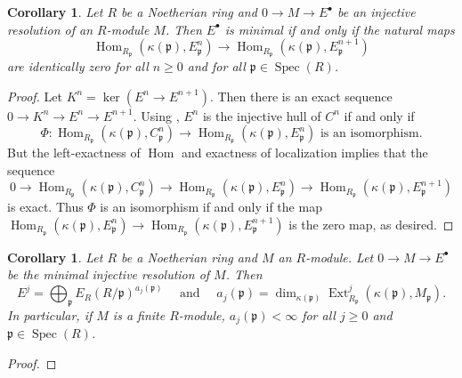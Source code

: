 \documentclass[10pt]{article}
\theoremstyle{thmstyle}
\theoremstyle{defstyle}
\newtheorem{corollary}[theorem]{Corollary}
\newcommand{\Spec}{\operatorname{Spec}}
\newcommand{\Hom}{\operatorname{Hom}}
\newcommand{\frakp}{\mathfrak{p}} %
\renewcommand{\ge}{\geqslant}
\newcommand{\Ext}{\operatorname{Ext}}
\begin{document}
\begin{corollary}
    Let $R$ be a Noetherian ring and $0\to M\to E^\bullet$ be an injective resolution of an $R$-module $M$. Then $E^\bullet$ is minimal if and only if the natural maps 
    \begin{equation*}
        \Hom_{R_\frakp}\left(\kappa(\frakp), E^n_\frakp\right)\longrightarrow\Hom_{R_\frakp}\left(\kappa(\frakp), E^{n + 1}_\frakp\right)
    \end{equation*}
    are identically zero for all $n\ge 0$ and for all $\frakp\in\Spec(R)$.
\end{corollary}
\begin{proof}
    Let $K^n = \ker\left(E^n\to E^{n + 1}\right)$. Then there is an exact sequence $0\to K^n\to E^n\to E^{n + 1}$. Using , $E^n$ is the injective hull of $C^n$ if and only if 
    \begin{equation*}
        \Phi: \Hom_{R_\frakp}\left(\kappa(\frakp), C^n_\frakp\right)\to \Hom_{R_\frakp}\left(\kappa(\frakp), E^{n}_\frakp\right)\text{ is an isomorphism}.
    \end{equation*}
    But the left-exactness of $\Hom$ and exactness of localization implies that the sequence 
    \begin{equation*}
        0\to\Hom_{R_\frakp}\left(\kappa(\frakp), C^n_\frakp\right)\to\Hom_{R_\frakp}\left(\kappa(\frakp), E^{n}_\frakp\right)\to\Hom_{R_\frakp}\left(\kappa(\frakp), E^{n + 1}_\frakp\right)
    \end{equation*}
    is exact. Thus $\Phi$ is an isomorphism if and only if the map $\Hom_{R_\frakp}\left(\kappa(\frakp), E^{n}_\frakp\right)\to\Hom_{R_\frakp}\left(\kappa(\frakp), E^{n + 1}_\frakp\right)$ is the zero map, as desired.
\end{proof}

\begin{corollary}
    Let $R$ be a Noetherian ring and $M$ an $R$-module. Let $0\to M\to E^\bullet$ be \emph{the} minimal injective resolution of $M$. Then 
    \begin{equation*}
        E^j = \bigoplus_{\frakp}E_R\left(R/\frakp\right)^{a_j(\frakp)}\quad\text{ and }\quad a_j(\frakp) = \dim_{\kappa(\frakp)} \Ext^j_{R_\frakp}\left(\kappa(\frakp), M_\frakp\right).
    \end{equation*}
    In particular, if $M$ is a finite $R$-module, $a_j(\frakp) < \infty$ for all $j\ge 0$ and $\frakp\in\Spec(R)$.
\end{corollary}
\begin{proof}
\end{proof}
\end{document}

